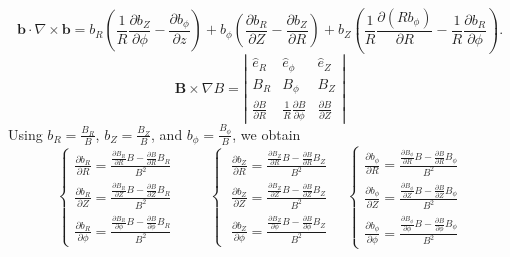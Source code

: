 \documentclass{article}
\begin{document}
\begin{equation}
  \mathbf{b} \cdot \nabla \times \mathbf{b}= b_R \left( \frac{1}{R} 
  \frac{\partial b_Z}{\partial \phi} - \frac{\partial b_{\phi}}{\partial z}
  \right) + b_{\phi} \left(  \frac{\partial b_R}{\partial Z} - \frac{\partial
  b_Z}{\partial R} \right) + b_Z \left( \frac{1}{R}  \frac{\partial (R
  b_{\phi})}{\partial R} - \frac{1}{R}  \frac{\partial b_R}{\partial \phi}
  \right) .
\end{equation}
\begin{equation}
  \mathbf{B} \times \nabla B = \left|\begin{array}{ccc}
    \hat{e}_R & \hat{e}_{\phi} & \hat{e}_Z\\
    B_R & B_{\phi} & B_Z\\
    \frac{\partial B}{\partial R} & \frac{1}{R}  \frac{\partial B}{\partial
    \phi} & \frac{\partial B}{\partial Z}
  \end{array}\right|
\end{equation}
Using $b_R = \frac{B_R}{B}$, $b_Z = \frac{B_Z}{B}$, and $b_{\phi} =
\frac{B_{\phi}}{B}$, we obtain
\begin{equation}
  \left\{ \begin{array}{l}
    \frac{\partial b_R}{\partial R} = \frac{\frac{\partial B_R}{\partial R} B
    - \frac{\partial B}{\partial R} B_R}{B^2}\\
    \frac{\partial b_R}{\partial Z} = \frac{\frac{\partial B_R}{\partial Z} B
    - \frac{\partial B}{\partial Z} B_R}{B^2}\\
    \frac{\partial b_R}{\partial \phi} = \frac{\frac{\partial B_R}{\partial
    \phi} B - \frac{\partial B}{\partial \phi} B_R}{B^2}
  \end{array} \qquad \right\{ \begin{array}{l}
    \frac{\partial b_Z}{\partial R} = \frac{\frac{\partial B_Z}{\partial R} B
    - \frac{\partial B}{\partial R} B_Z}{B^2}\\
    \frac{\partial b_Z}{\partial Z} = \frac{\frac{\partial B_Z}{\partial Z} B
    - \frac{\partial B}{\partial Z} B_Z}{B^2}\\
    \frac{\partial b_Z}{\partial \phi} = \frac{\frac{\partial B_Z}{\partial
    \phi} B - \frac{\partial B}{\partial \phi} B_Z}{B^2}
  \end{array} \quad \left\{ \begin{array}{l}
    \frac{\partial b_{\phi}}{\partial R} = \frac{\frac{\partial
    B_{\phi}}{\partial R} B - \frac{\partial B}{\partial R} B_{\phi}}{B^2}\\
    \frac{\partial b_{\phi}}{\partial Z} = \frac{\frac{\partial
    B_{\phi}}{\partial Z} B - \frac{\partial B}{\partial Z} B_{\phi}}{B^2}\\
    \frac{\partial b_{\phi}}{\partial \phi} = \frac{\frac{\partial
    B_{\phi}}{\partial \phi} B - \frac{\partial B}{\partial \phi}
    B_{\phi}}{B^2}
  \end{array} \right.
\end{equation}
\end{document}
